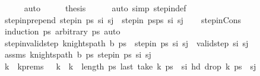 \begin{isabellebody}
\ \ \ \ \isamarkupfalse%
\ auto\isanewline
\ \ \isamarkupfalse%
\ \isamarkupfalse%
\ {\isacharquery}{\kern0pt}thesis\isanewline
\ \ \ \ \isamarkupfalse%
\ {\isacharparenleft}{\kern0pt}auto\ simp{\isacharcolon}{\kern0pt}\ step{\isacharunderscore}{\kern0pt}in{\isacharunderscore}{\kern0pt}def{\isacharparenright}{\kern0pt}\isanewline
{}\isamarkupfalse%
%
\endisatagproof
{\isafoldproof}%
%
\isadelimproof
\isanewline
%
\endisadelimproof
\isanewline
{}\isamarkupfalse%
\ step{\isacharunderscore}{\kern0pt}in{\isacharunderscore}{\kern0pt}prepend{\isacharcolon}{\kern0pt}\ {\isachardoublequoteopen}step{\isacharunderscore}{\kern0pt}in\ ps\ s\isactrlsub i\ s\isactrlsub j\ {\isasymLongrightarrow}\ step{\isacharunderscore}{\kern0pt}in\ {\isacharparenleft}{\kern0pt}ps{\isacharprime}{\kern0pt}{\isacharat}{\kern0pt}ps{\isacharparenright}{\kern0pt}\ s\isactrlsub i\ s\isactrlsub j{\isachardoublequoteclose}\isanewline
%
\isadelimproof
\ \ %
\endisadelimproof
%
\isatagproof
{}\isamarkupfalse%
\ step{\isacharunderscore}{\kern0pt}in{\isacharunderscore}{\kern0pt}Cons\ \isamarkupfalse%
\ {\isacharparenleft}{\kern0pt}induction\ ps{\isacharprime}{\kern0pt}\ arbitrary{\isacharcolon}{\kern0pt}\ ps{\isacharparenright}{\kern0pt}\ auto%
\endisatagproof
{\isafoldproof}%
%
\isadelimproof
\isanewline
%
\endisadelimproof
\isanewline
{}\isamarkupfalse%
\ step{\isacharunderscore}{\kern0pt}in{\isacharunderscore}{\kern0pt}valid{\isacharunderscore}{\kern0pt}step{\isacharcolon}{\kern0pt}\ {\isachardoublequoteopen}knights{\isacharunderscore}{\kern0pt}path\ b\ ps\ {\isasymLongrightarrow}\ step{\isacharunderscore}{\kern0pt}in\ ps\ s\isactrlsub i\ s\isactrlsub j\ {\isasymLongrightarrow}\ valid{\isacharunderscore}{\kern0pt}step\ s\isactrlsub i\ s\isactrlsub j{\isachardoublequoteclose}\isanewline
%
\isadelimproof
%
\endisadelimproof
%
\isatagproof
{}\isamarkupfalse%
\ {\isacharminus}{\kern0pt}\isanewline
\ \ \isamarkupfalse%
\ assms{\isacharcolon}{\kern0pt}\ {\isachardoublequoteopen}knights{\isacharunderscore}{\kern0pt}path\ b\ ps{\isachardoublequoteclose}\ {\isachardoublequoteopen}step{\isacharunderscore}{\kern0pt}in\ ps\ s\isactrlsub i\ s\isactrlsub j{\isachardoublequoteclose}\isanewline
\ \ \isamarkupfalse%
\ \isamarkupfalse%
\ k\ \ k{\isacharunderscore}{\kern0pt}prems{\isacharcolon}{\kern0pt}\ {\isachardoublequoteopen}{}\ {\isacharless}{\kern0pt}\ k\ {\isasymand}\ k\ {\isacharless}{\kern0pt}\ length\ ps{\isachardoublequoteclose}\ {\isachardoublequoteopen}last\ {\isacharparenleft}{\kern0pt}take\ k\ ps{\isacharparenright}{\kern0pt}\ {\isacharequal}{\kern0pt}\ s\isactrlsub i{\isachardoublequoteclose}\ {\isachardoublequoteopen}hd\ {\isacharparenleft}{\kern0pt}drop\ k\ ps{\isacharparenright}{\kern0pt}\ {\isacharequal}{\kern0pt}\ s\isactrlsub j{\isachardoublequoteclose}\isanewline

\end{isabellebody}
